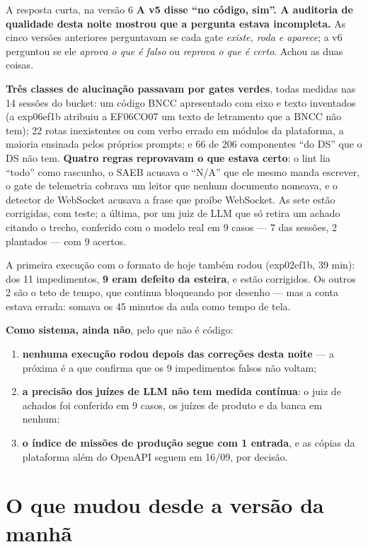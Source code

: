 \documentclass[11pt,a4paper]{article}
\begin{document}
\begin{vereditobox}{A resposta curta, na versão 6}
\textbf{A v5 disse ``no código, sim''. A auditoria de qualidade desta noite mostrou que a pergunta estava incompleta.} As cinco versões anteriores perguntavam se cada gate \emph{existe, roda e aparece}; a v6 perguntou se ele \emph{aprova o que é falso} ou \emph{reprova o que é certo}. Achou as duas coisas.

\textbf{Três classes de alucinação passavam por gates verdes}, todas medidas nas 14 sessões do bucket: um código BNCC apresentado com eixo e texto inventados (a exp06ef1b atribuiu a EF06CO07 um texto de letramento que a BNCC não tem); 22 rotas inexistentes ou com verbo errado em módulos da plataforma, a maioria ensinada pelos próprios prompts; e 66 de 206 componentes ``do DS'' que o DS não tem. \textbf{Quatro regras reprovavam o que estava certo}: o lint lia ``todo'' como rascunho, o SAEB acusava o ``N/A'' que ele mesmo manda escrever, o gate de telemetria cobrava um leitor que nenhum documento nomeava, e o detector de WebSocket acusava a frase que proíbe WebSocket. As sete estão corrigidas, com teste; a última, por um juiz de LLM que só retira um achado citando o trecho, conferido com o modelo real em 9 casos --- 7 das sessões, 2 plantados --- com 9 acertos.

A primeira execução com o formato de hoje também rodou (exp02ef1b, 39 min): dos 11 impedimentos, \textbf{9 eram defeito da esteira}, e estão corrigidos. Os outros 2 são o teto de tempo, que continua bloqueando por desenho --- mas a conta estava errada: somava os 45 minutos da aula como tempo de tela.

\textbf{Como sistema, ainda não}, pelo que não é código:
\begin{enumerate}[nosep,leftmargin=*]
  \item \textbf{nenhuma execução rodou depois das correções desta noite} --- a próxima é a que confirma que os 9 impedimentos falsos não voltam;
  \item \textbf{a precisão dos juízes de LLM não tem medida contínua}: o juiz de achados foi conferido em 9 casos, os juízes de produto e da banca em nenhum;
  \item \textbf{o índice de missões de produção segue com 1 entrada}, e as cópias da plataforma além do OpenAPI seguem em 16/09, por decisão.
\end{enumerate}
\end{vereditobox}

\section{O que mudou desde a versão da manhã}
\end{document}
